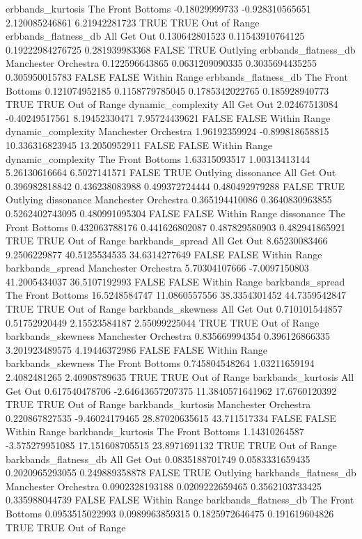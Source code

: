 erbbands_kurtosis The Front Bottoms -0.18029999733 -0.928310565651 2.120085246861 6.21942281723 TRUE TRUE Out of Range
erbbands_flatness_db All Get Out 0.130642801523 0.11543910764125 0.19222984276725 0.281939983368 FALSE TRUE Outlying
erbbands_flatness_db Manchester Orchestra 0.122596643865 0.0631209090335 0.3035694435255 0.305950015783 FALSE FALSE Within Range
erbbands_flatness_db The Front Bottoms 0.121074952185 0.1158779785045 0.1785342022765 0.185928940773 TRUE TRUE Out of Range
dynamic_complexity All Get Out 2.02467513084 -0.40249517561 8.19452330471 7.95724439621 FALSE FALSE Within Range
dynamic_complexity Manchester Orchestra 1.96192359924 -0.899818658815 10.336316823945 13.2050952911 FALSE FALSE Within Range
dynamic_complexity The Front Bottoms 1.63315093517 1.00313413144 5.26130616664 6.5027141571 FALSE TRUE Outlying
dissonance All Get Out 0.396982818842 0.436238083988 0.499372724444 0.480492979288 FALSE TRUE Outlying
dissonance Manchester Orchestra 0.365194410086 0.3640830963855 0.5262402743095 0.480991095304 FALSE FALSE Within Range
dissonance The Front Bottoms 0.432063788176 0.441626802087 0.487829580903 0.482941865921 TRUE TRUE Out of Range
barkbands_spread All Get Out 8.65230083466 9.2506229877 40.5125534535 34.6314277649 FALSE FALSE Within Range
barkbands_spread Manchester Orchestra 5.70304107666 -7.0097150803 41.2005434037 36.5107192993 FALSE FALSE Within Range
barkbands_spread The Front Bottoms 16.5248584747 11.0860557556 38.3354301452 44.7359542847 TRUE TRUE Out of Range
barkbands_skewness All Get Out 0.710101544857 0.51752920449 2.15523584187 2.55099225044 TRUE TRUE Out of Range
barkbands_skewness Manchester Orchestra 0.835669994354 0.396126866335 3.201923489575 4.19446372986 FALSE FALSE Within Range
barkbands_skewness The Front Bottoms 0.745804548264 1.03211659194 2.4082481265 2.40908789635 TRUE TRUE Out of Range
barkbands_kurtosis All Get Out 0.617540478706 -2.64643657207375 11.3840571641962 17.6760120392 TRUE TRUE Out of Range
barkbands_kurtosis Manchester Orchestra 0.220867827535 -9.46024179465 28.87020635615 43.711517334 FALSE FALSE Within Range
barkbands_kurtosis The Front Bottoms 1.14310264587 -3.575279951085 17.151608705515 23.8971691132 TRUE TRUE Out of Range
barkbands_flatness_db All Get Out 0.0835188701749 0.0583331659435 0.2020965293055 0.249889358878 FALSE TRUE Outlying
barkbands_flatness_db Manchester Orchestra 0.0902328193188 0.0209222659465 0.3562103733425 0.335988044739 FALSE FALSE Within Range
barkbands_flatness_db The Front Bottoms 0.0953515022993 0.0989963859315 0.1825972646475 0.191619604826 TRUE TRUE Out of Range
